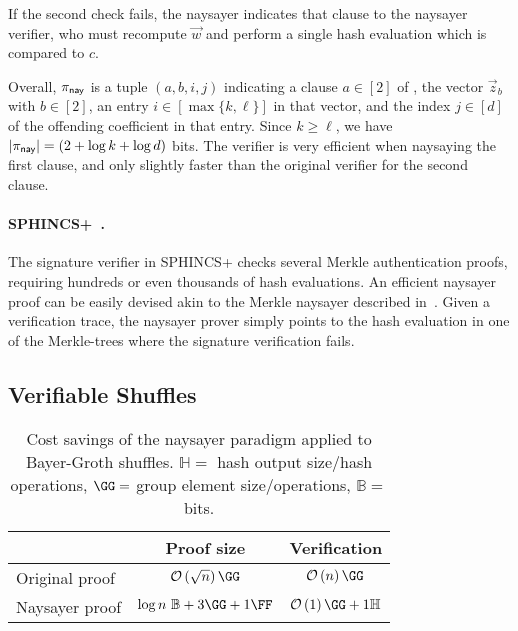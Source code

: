 If the second check fails, the naysayer indicates that clause to the naysayer verifier, who must recompute $\vec{w}$ and perform a single hash evaluation which is compared to $c$.

Overall, $\pi_{\mathsf{nay}}$ is a tuple $(a, b, i, j)$ indicating a clause $a \in [2]$ of , the vector $\vec{z}_b$ with $b \in [2]$, an entry $i \in [\max\{k,\ell\}]$ in that vector, and the index $j \in [d]$ of the offending coefficient in that entry. Since $k \geq \ell$, we have $\lvert \pi_{\mathsf{nay}} \rvert = (2+\log{k}+\log{d})$ bits. The verifier is very efficient when naysaying the first clause, and only slightly faster than the original verifier for the second clause.

\paragraph{SPHINCS+~\cite{CCS:BHKNRS19}.} The signature verifier in SPHINCS+ checks several Merkle authentication proofs, requiring hundreds or even thousands of hash evaluations. An efficient naysayer proof can be easily devised akin to the Merkle naysayer described in~. Given a verification trace, the naysayer prover simply points to the hash evaluation in one of the Merkle-trees where the signature verification fails. 

\subsection{Verifiable Shuffles}\label{sec:vshuffle_naysayer}

\begin{table}[h]
   \centering
    \setlength{\belowbottomsep}{6pt}
    \begin{tabular}{l c c} 
    \toprule
     & \textbf{Proof size}
     & \textbf{Verification}
     \\ \midrule
     Original proof
     & $\bigO{\sqrt{n}}\GG$
     & $\bigO{n}\GG$ 
     \\\midrule
     Naysayer proof
     & $\log{n}\ \mathbb{B}+3\GG+1\FF$ 
     & $\bigO{1}\GG + 1\mathbb{H}$
    \\ \bottomrule
    \end{tabular}
    \caption{Cost savings of the naysayer paradigm applied to Bayer-Groth shuffles. $\mathbb{H} =$ hash output size/hash operations, $\GG=$ group element size/operations, $\mathbb{B} =$ bits.}
    \label{tab:shuffle_asym}
   \end{table}

